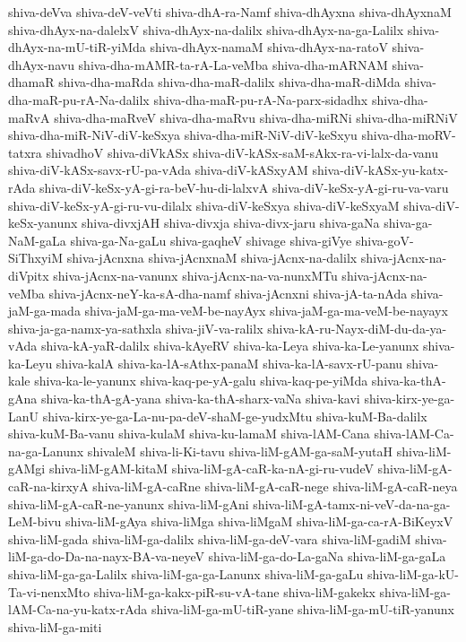 {shiva-deVva
shiva-deV-veVti
shiva-dhA-ra-Namf
shiva-dhAyxna
shiva-dhAyxnaM
shiva-dhAyx-na-dalelxV
shiva-dhAyx-na-dalilx
shiva-dhAyx-na-ga-Lalilx
shiva-dhAyx-na-mU-tiR-yiMda
shiva-dhAyx-namaM
shiva-dhAyx-na-ratoV
shiva-dhAyx-navu
shiva-dha-mAMR-ta-rA-La-veMba
shiva-dha-mARNAM
shiva-dhamaR
shiva-dha-maRda
shiva-dha-maR-dalilx
shiva-dha-maR-diMda
shiva-dha-maR-pu-rA-Na-dalilx
shiva-dha-maR-pu-rA-Na-parx-sidadhx
shiva-dha-maRvA
shiva-dha-maRveV
shiva-dha-maRvu
shiva-dha-miRNi
shiva-dha-miRNiV
shiva-dha-miR-NiV-diV-keSxya
shiva-dha-miR-NiV-diV-keSxyu
shiva-dha-moRV-tatxra
shivadhoV
shiva-diVkASx
shiva-diV-kASx-saM-sAkx-ra-vi-lalx-da-vanu
shiva-diV-kASx-savx-rU-pa-vAda
shiva-diV-kASxyAM
shiva-diV-kASx-yu-katx-rAda
shiva-diV-keSx-yA-gi-ra-beV-hu-di-lalxvA
shiva-diV-keSx-yA-gi-ru-va-varu
shiva-diV-keSx-yA-gi-ru-vu-dilalx
shiva-diV-keSxya
shiva-diV-keSxyaM
shiva-diV-keSx-yanunx
shiva-divxjAH
shiva-divxja
shiva-divx-jaru
shiva-gaNa
shiva-ga-NaM-gaLa
shiva-ga-Na-gaLu
shiva-gaqheV
shivage
shiva-giVye
shiva-goV-SiThxyiM
shiva-jAcnxna
shiva-jAcnxnaM
shiva-jAcnx-na-dalilx
shiva-jAcnx-na-diVpitx
shiva-jAcnx-na-vanunx
shiva-jAcnx-na-va-nunxMTu
shiva-jAcnx-na-veMba
shiva-jAcnx-neY-ka-sA-dha-namf
shiva-jAcnxni
shiva-jA-ta-nAda
shiva-jaM-ga-mada
shiva-jaM-ga-ma-veM-be-nayAyx
shiva-jaM-ga-ma-veM-be-nayayx
shiva-ja-ga-namx-ya-sathxla
shiva-jiV-va-ralilx
shiva-kA-ru-Nayx-diM-du-da-ya-vAda
shiva-kA-yaR-dalilx
shiva-kAyeRV
shiva-ka-Leya
shiva-ka-Le-yanunx
shiva-ka-Leyu
shiva-kalA
shiva-ka-lA-sAthx-panaM
shiva-ka-lA-savx-rU-panu
shiva-kale
shiva-ka-le-yanunx
shiva-kaq-pe-yA-galu
shiva-kaq-pe-yiMda
shiva-ka-thA-gAna
shiva-ka-thA-gA-yana
shiva-ka-thA-sharx-vaNa
shiva-kavi
shiva-kirx-ye-ga-LanU
shiva-kirx-ye-ga-La-nu-pa-deV-shaM-ge-yudxMtu
shiva-kuM-Ba-dalilx
shiva-kuM-Ba-vanu
shiva-kulaM
shiva-ku-lamaM
shiva-lAM-Cana
shiva-lAM-Ca-na-ga-Lanunx
shivaleM
shiva-li-Ki-tavu
shiva-liM-gAM-ga-saM-yutaH
shiva-liM-gAMgi
shiva-liM-gAM-kitaM
shiva-liM-gA-caR-ka-nA-gi-ru-vudeV
shiva-liM-gA-caR-na-kirxyA
shiva-liM-gA-caRne
shiva-liM-gA-caR-nege
shiva-liM-gA-caR-neya
shiva-liM-gA-caR-ne-yanunx
shiva-liM-gAni
shiva-liM-gA-tamx-ni-veV-da-na-ga-LeM-bivu
shiva-liM-gAya
shiva-liMga
shiva-liMgaM
shiva-liM-ga-ca-rA-BiKeyxV
shiva-liM-gada
shiva-liM-ga-dalilx
shiva-liM-ga-deV-vara
shiva-liM-gadiM
shiva-liM-ga-do-Da-na-nayx-BA-va-neyeV
shiva-liM-ga-do-La-gaNa
shiva-liM-ga-gaLa
shiva-liM-ga-ga-Lalilx
shiva-liM-ga-ga-Lanunx
shiva-liM-ga-gaLu
shiva-liM-ga-kU-Ta-vi-nenxMto
shiva-liM-ga-kakx-piR-su-vA-tane
shiva-liM-gakekx
shiva-liM-ga-lAM-Ca-na-yu-katx-rAda
shiva-liM-ga-mU-tiR-yane
shiva-liM-ga-mU-tiR-yanunx
shiva-liM-ga-miti
}
